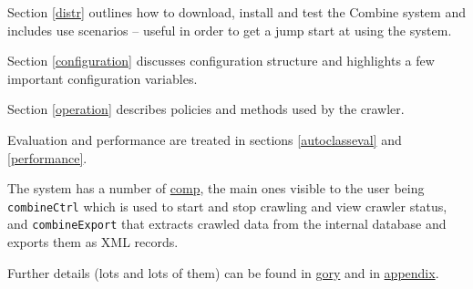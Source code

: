 Section \ref{distr}
 outlines how to download, install and test the Combine system and includes use scenarios -- useful in order to get a jump start at using the system.

Section \ref{configuration} discusses configuration structure and highlights a few important configuration variables.

Section \ref{operation} describes policies and methods used by the crawler.

 Evaluation and performance are treated in sections
\ref{autoclasseval} and \ref{performance}.


The system has a number of \hyperref{components}{components (see
section }{)}{comp}, the main ones visible to the user being {\tt combineCtrl}
which is used to start and stop crawling and view crawler status, and
{\tt combineExport} that extracts crawled data from the internal
database and exports them as XML records.

Further details (lots and lots of them) can be found in \hyperref{'Gory details'}{part }{ 'Gory details'}{gory} and in \hyperref{the Appendix}{Appendix }{}{appendix}.
